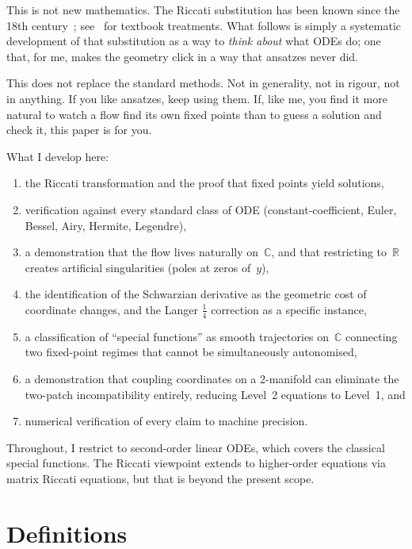 \documentclass{amsart}
\theoremstyle{definition}
\theoremstyle{remark}
\begin{document}
This is not new mathematics. The Riccati substitution has been known since the 18th century~\cite{Riccati1724}; see~\cite{Ince1956, Reid1972} for textbook treatments. What follows is simply a systematic development of that substitution as a way to \emph{think about} what ODEs do; one that, for me, makes the geometry click in a way that ansatzes never did.

This does not replace the standard methods. Not in generality, not in rigour, not in anything. If you like ansatzes, keep using them. If, like me, you find it more natural to watch a flow find its own fixed points than to guess a solution and check it, this paper is for you.

What I develop here:
\begin{enumerate}[label=(\roman*)]
\item the Riccati transformation and the proof that fixed points yield solutions,
\item verification against every standard class of ODE (constant-coefficient, Euler, Bessel, Airy, Hermite, Legendre),
\item a demonstration that the flow lives naturally on~$\mathbb{C}$, and that restricting to~$\mathbb{R}$ creates artificial singularities (poles at zeros of~$y$),
\item the identification of the Schwarzian derivative as the geometric cost of coordinate changes, and the Langer $\tfrac{1}{4}$ correction as a specific instance,
\item a classification of ``special functions'' as smooth trajectories on~$\mathbb{C}$ connecting two fixed-point regimes that cannot be simultaneously autonomised,
\item a demonstration that coupling coordinates on a 2-manifold can eliminate the two-patch incompatibility entirely, reducing Level~2 equations to Level~1, and
\item numerical verification of every claim to machine precision.
\end{enumerate}

Throughout, I restrict to second-order linear ODEs, which covers the classical special functions. The Riccati viewpoint extends to higher-order equations via matrix Riccati equations, but that is beyond the present scope.

\section{Definitions}
\end{document}
